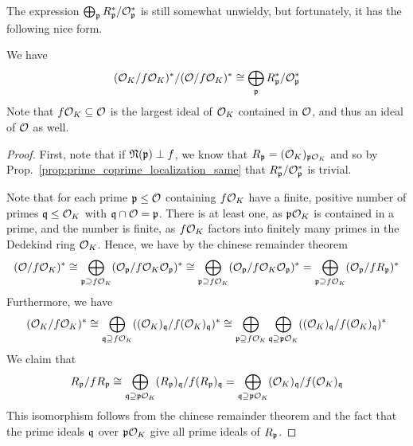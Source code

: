 The expression $\bigoplus_\p R_\p^*/\O_\p^*$ is still somewhat unwieldy, but fortunately, it has the following nice form.
\begin{lemma}
    We have
    \begin{equation*}
        (\O_K/f\O_K)^*/(\O/f\O_K)^* \cong \bigoplus_\p R_\p^*/\O_\p^*
    \end{equation*}
    Note that $f\O_K \subseteq \O$ is the largest ideal of $\O_K$ contained in $\O$, and thus an ideal of $\O$ as well.
\end{lemma}
\begin{proof}
    First, note that if $\Norm(\p) \perp f$, we know that $R_\p = (\O_K)_{\p\O_K}$ and so by Prop.~\ref{prop:prime_coprime_localization_same} that $R_\p^*/\O_\p^*$ is trivial.
    
    Note that for each prime $\p \leq \O$ containing $f\O_K$ have a finite, positive number of primes $\q \leq \O_K$ with $\q \cap \O = \p$.
    There is at least one, as $\p\O_K$ is contained in a prime, and the number is finite, as $f\O_K$ factors into finitely many primes in the Dedekind ring $\O_K$.
    Hence, we have by the chinese remainder theorem
    \begin{equation*}
        (\O/f\O_K)^* \cong \bigoplus_{\p \supseteq f\O_K} (\O_\p/f\O_K\O_\p)^* \cong \bigoplus_{\p \supseteq f\O_K} (\O_\p/f\O_K\O_\p)^* = \bigoplus_{\p \supseteq f\O_K} (\O_\p/fR_\p)^*
    \end{equation*}
    Furthermore, we have
    \begin{equation*}
        (\O_K/f\O_K)^* \cong \bigoplus_{\q \supseteq f\O_K} ((\O_K)_\q/f(\O_K)_\q)^* \cong \bigoplus_{\p \supseteq f\O_K} \bigoplus_{\q \supseteq \p\O_K} ((\O_K)_\q/f(\O_K)_\q)^*
    \end{equation*}
    We claim that
    \begin{equation*}
        R_\p/fR_\p \cong \bigoplus_{\q \supseteq \p\O_K} (R_\p)_\q/f(R_\p)_\q = \bigoplus_{\q \supseteq \p\O_K} (\O_K)_\q/f(\O_K)_\q
    \end{equation*}
    This isomorphism follows from the chinese remainder theorem and the fact that the prime ideals $\q$ over $\p\O_K$ give all prime ideals of $R_\p$.
    

\end{proof}
